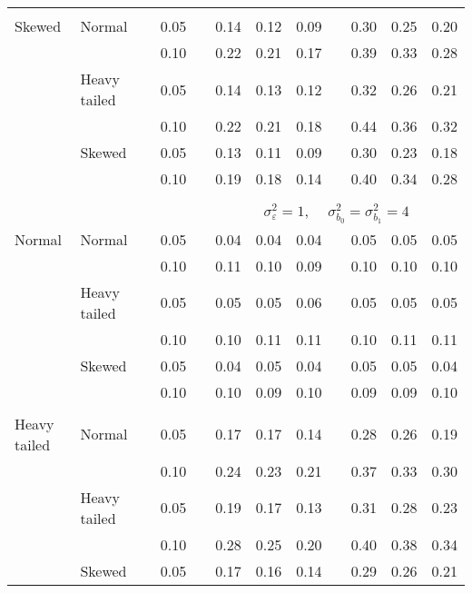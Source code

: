\begin{table}[ht]
\begin{scriptsize}
\begin{center}
\begin{tabular}{ll p{.1cm} c p{.1cm} rrr p{.1cm} rrr}
             &&&&&&&&&&&\\
Skewed       & Normal       && 0.05 &&  0.14 & 0.12 & 0.09 && 0.30 & 0.25 & 0.20 \\ 
             &              && 0.10 &&  0.22 & 0.21 & 0.17 && 0.39 & 0.33 & 0.28 \\ 
             & Heavy tailed && 0.05 &&  0.14 & 0.13 & 0.12 && 0.32 & 0.26 & 0.21 \\ 
             &              && 0.10 &&  0.22 & 0.21 & 0.18 && 0.44 & 0.36 & 0.32 \\ 
             & Skewed       && 0.05 &&  0.13 & 0.11 & 0.09 && 0.30 & 0.23 & 0.18 \\ 
             &              && 0.10 &&  0.19 & 0.18 & 0.14 && 0.40 & 0.34 & 0.28 \\ 


&&&&&&&&&&&\\
& && && \multicolumn{7}{c}{$\sigma_{\varepsilon}^2 = 1$, \ \ $\sigma_{b_0}^2 = \sigma_{b_1}^2 = 4$} \\ \cline{6-12}
\rowcolor{gray!20}Normal       & Normal       && 0.05 &&  0.04 & 0.04 & 0.04 && 0.05 & 0.05 & 0.05 \\ 
\rowcolor{gray!20}             &              && 0.10 &&  0.11 & 0.10 & 0.09 && 0.10 & 0.10 & 0.10 \\ 
\rowcolor{gray!20}             & Heavy tailed && 0.05 &&  0.05 & 0.05 & 0.06 && 0.05 & 0.05 & 0.05 \\ 
\rowcolor{gray!20}             &              && 0.10 &&  0.10 & 0.11 & 0.11 && 0.10 & 0.11 & 0.11 \\ 
\rowcolor{gray!20}             & Skewed       && 0.05 &&  0.04 & 0.05 & 0.04 && 0.05 & 0.05 & 0.04 \\ 
\rowcolor{gray!20}             &              && 0.10 &&  0.10 & 0.09 & 0.10 && 0.09 & 0.09 & 0.10 \\
             &&&&&&&&&&&\\ 
Heavy tailed & Normal       && 0.05 &&  0.17 & 0.17 & 0.14 && 0.28 & 0.26 & 0.19 \\ 
             &              && 0.10 &&  0.24 & 0.23 & 0.21 && 0.37 & 0.33 & 0.30 \\ 
             & Heavy tailed && 0.05 &&  0.19 & 0.17 & 0.13 && 0.31 & 0.28 & 0.23 \\ 
             &              && 0.10 &&  0.28 & 0.25 & 0.20 && 0.40 & 0.38 & 0.34 \\ 
             & Skewed       && 0.05 &&  0.17 & 0.16 & 0.14 && 0.29 & 0.26 & 0.21 \\ 

\end{tabular}
\end{center}
\end{scriptsize}
\end{table}
